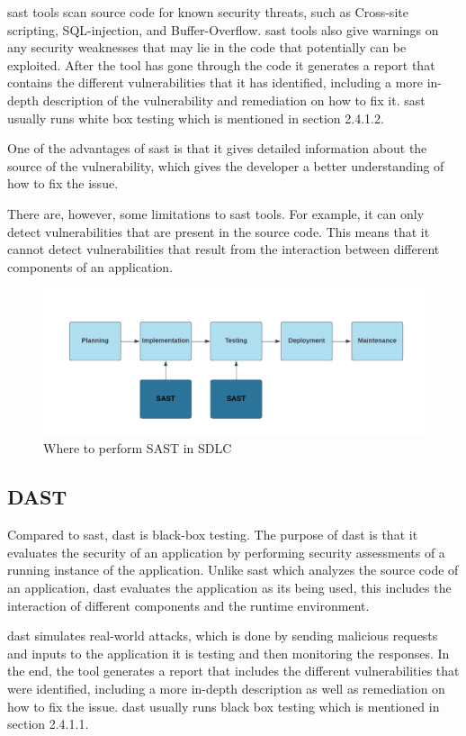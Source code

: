 \acrshort{sast} tools scan source code for known security threats, such as \gls{Cross-site scripting}, \gls{SQL-injection}, and \gls{Buffer-Overflow}. \acrshort{sast} tools also give warnings on any security weaknesses that may lie in the code that potentially can be exploited. After the tool has gone through the code it generates a report that contains the different vulnerabilities that it has identified, including a more in-depth description of the vulnerability and remediation on how to fix it. \acrshort{sast} usually runs white box testing  which is mentioned in section 2.4.1.2. 

One of the advantages of \acrshort{sast} is that it gives detailed information about the source of the vulnerability, which gives the developer a better understanding of how to fix the issue. 

There are, however, some limitations to \acrshort{sast} tools. For example, it can only detect vulnerabilities that are present in the source code. This means that it cannot detect vulnerabilities that result from the interaction between different components of an application.
\\
\begin{figure}[H]
    \centering
    \includegraphics[width=0.8\columnwidth]{Images/sast.png}
    \caption{Where to perform SAST in SDLC}
    \label{fig: Performance of SAST in SDLC}
\end{figure}


\subsection{DAST}
Compared to \acrshort{sast}, \acrlong{dast} is black-box testing. The purpose of \acrshort{dast} is that it evaluates the security of an application by performing security assessments of a running instance of the application. Unlike \acrshort{sast} which analyzes the source code of an application, \acrshort{dast} evaluates the application as its being used, this includes the interaction of different components and the runtime environment. 

\acrshort{dast} simulates real-world attacks, which is done by sending malicious requests and inputs to the application it is testing and then monitoring the responses. In the end, the tool generates a report that includes the different vulnerabilities that were identified, including a more in-depth description as well as remediation on how to fix the issue. 
\acrshort{dast} usually runs black box testing  which is mentioned in section 2.4.1.1. \cite{dast}

